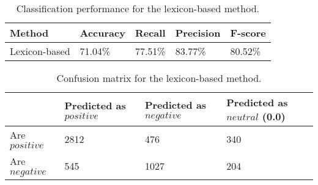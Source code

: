 \begin{table}
\caption{Classification performance for the lexicon-based method.}
\label{tab:eval_lex}
\centering
\begin{tabular}{ |p{3cm}||p{2cm}|p{2cm}|p{2cm}|p{2cm}|}
 \hline
 Method &          Accuracy &      Recall &     Precision& F-score \\
  \hline
 Lexicon-based & 71.04\% & 77.51\% & 83.77\% & 80.52\% \\
 \hline
 \end{tabular}
 
\end{table}
\begin{table}
\centering
\caption{Confusion matrix for the lexicon-based method.}
\begin{tabular}{ |p{3cm}||p{3cm}|p{3cm}|p{3cm}| }
 \hline
  &          Predicted as $positive$ &Predicted as $negative$  & Predicted as $neutral$ (0.0)\\
 \hline
 Are $positive$        & 2812&            476 & 340\\
  \hline
 Are $negative$  &545&                     1027 & 204\\
 \hline

\end{tabular}
\label{tab:evaluations_conf_lex}
\end{table}



